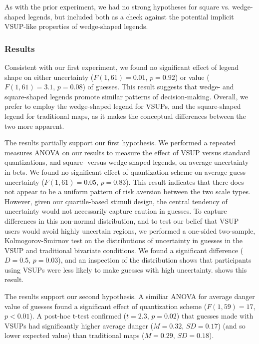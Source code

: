 As with the prior experiment, we had no strong hypotheses for square vs. wedge-shaped legends, but included both as a check against the potential implicit VSUP-like properties of wedge-shaped legends.

\subsubsection{Results} 
\taskTwoQuartiles

Consistent with our first experiment, we found no significant effect of legend shape on either uncertainty ($F(1,61) = 0.01$, $p=0.92$) or value ($F(1,61)=3.1$, $p=0.08$) of guesses. This result suggests that wedge- and square-shaped legends promote similar patterns of decision-making. Overall, we prefer to employ the wedge-shaped legend for VSUPs, and the square-shaped legend for traditional maps, as it makes the conceptual differences between the two more apparent.

The results partially support our first hypothesis. We performed a repeated measures ANOVA on our results to measure the effect of VSUP versus standard quantizations, and square- versus wedge-shaped legends, on average uncertainty in bets. We found no significant effect of quantization scheme on average guess uncertainty ($F(1,61)=0.05$, $p=0.83$). This result indicates that there does not appear to be a uniform pattern of risk aversion between the two scale types. However, given our quartile-based stimuli design, the central tendency of uncertainty would not necessarily capture caution in guesses. To capture differences in this non-normal distribution, and to test our belief that VSUP users would avoid highly uncertain regions, we performed a one-sided two-sample, Kolmogorov-Smirnov test on the distributions of uncertainty in guesses in the VSUP and traditional bivariate conditions. We found a significant difference ($D = 0.5$, $p=0.03$), and an inspection of the distribution shows that participants using VSUPs were less likely to make guesses with high uncertainty.  shows this result.

The results support our second hypothesis. A similiar ANOVA for average danger value of guesses found a significant effect of quantization scheme ($F(1,59)=17$, $p<0.01$). A post-hoc t-test confirmed ($t=2.3$, $p=0.02$) that guesses made with VSUPs had significantly higher average danger ($M=0.32$, $SD=0.17$) (and so lower expected value) than traditional maps ($M=0.29$, $SD=0.18$).

